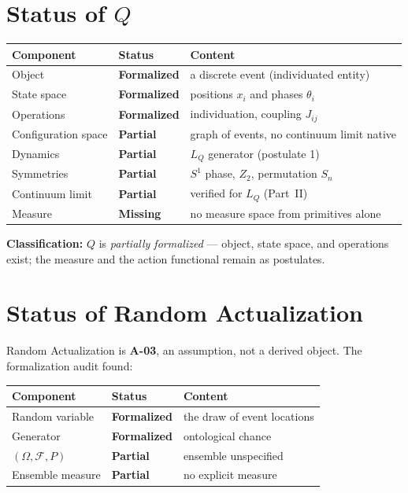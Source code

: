\documentclass[11pt,twoside]{book}
\begin{document}
\section{Status of $Q$}

\begin{center}
\begin{tabular}{lll}
\toprule
Component & Status & Content \\
\midrule
Object & \textbf{Formalized} & a discrete event (individuated entity) \\
State space & \textbf{Formalized} & positions $x_i$ and phases $\theta_i$ \\
Operations & \textbf{Formalized} & individuation, coupling $J_{ij}$ \\
Configuration space & \textbf{Partial} & graph of events, no continuum limit native \\
Dynamics & \textbf{Partial} & $L_Q$ generator (postulate 1) \\
Symmetries & \textbf{Partial} & $S^1$ phase, $Z_2$, permutation $S_n$ \\
Continuum limit & \textbf{Partial} & verified for $L_Q$ (Part~II) \\
Measure & \textbf{Missing} & no measure space from primitives alone \\
\bottomrule
\end{tabular}
\end{center}

\textbf{Classification:} $Q$ is \emph{partially formalized} — object, state space, and
operations exist; the measure and the action functional remain as postulates.

\section{Status of Random Actualization}

Random Actualization is \textbf{A-03}, an assumption, not a derived object. The
formalization audit found:

\begin{center}
\begin{tabular}{lll}
\toprule
Component & Status & Content \\
\midrule
Random variable & \textbf{Formalized} & the draw of event locations \\
Generator & \textbf{Formalized} & ontological chance \\
$(\Omega,\mathcal F,P)$ & \textbf{Partial} & ensemble unspecified \\
Ensemble measure & \textbf{Partial} & no explicit measure \\
\bottomrule
\end{tabular}
\end{center}
\end{document}
